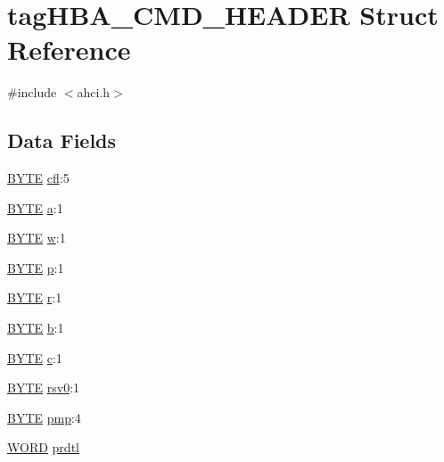 \hypertarget{structtagHBA__CMD__HEADER}{}\section{tag\+H\+B\+A\+\_\+\+C\+M\+D\+\_\+\+H\+E\+A\+D\+ER Struct Reference}
\label{structtagHBA__CMD__HEADER}


{\ttfamily \#include $<$ahci.\+h$>$}

\subsection*{Data Fields}
\begin{DoxyCompactItemize}
\item 
\hyperlink{ahci_8h_aae9749d96e15ccb4f482dd5f55d98f9b}{B\+Y\+TE} \hyperlink{structtagHBA__CMD__HEADER_a9b96c30cf860921253cd6cbac596307c}{cfl}\+:5
\item 
\hyperlink{ahci_8h_aae9749d96e15ccb4f482dd5f55d98f9b}{B\+Y\+TE} \hyperlink{structtagHBA__CMD__HEADER_ac07bb464769560ba80f2fdf92917a3a5}{a}\+:1
\item 
\hyperlink{ahci_8h_aae9749d96e15ccb4f482dd5f55d98f9b}{B\+Y\+TE} \hyperlink{structtagHBA__CMD__HEADER_a1e268f69308d471e20b13dbfadc2b4ac}{w}\+:1
\item 
\hyperlink{ahci_8h_aae9749d96e15ccb4f482dd5f55d98f9b}{B\+Y\+TE} \hyperlink{structtagHBA__CMD__HEADER_a907bfe5e928116c55338fd104557af8b}{p}\+:1
\item 
\hyperlink{ahci_8h_aae9749d96e15ccb4f482dd5f55d98f9b}{B\+Y\+TE} \hyperlink{structtagHBA__CMD__HEADER_ac78c4a22ee2ff09061a213403da50660}{r}\+:1
\item 
\hyperlink{ahci_8h_aae9749d96e15ccb4f482dd5f55d98f9b}{B\+Y\+TE} \hyperlink{structtagHBA__CMD__HEADER_a457f51749a36f13b1670185f113f55f9}{b}\+:1
\item 
\hyperlink{ahci_8h_aae9749d96e15ccb4f482dd5f55d98f9b}{B\+Y\+TE} \hyperlink{structtagHBA__CMD__HEADER_ac17a38c08ae3194b80e2a95180c409b5}{c}\+:1
\item 
\hyperlink{ahci_8h_aae9749d96e15ccb4f482dd5f55d98f9b}{B\+Y\+TE} \hyperlink{structtagHBA__CMD__HEADER_a4c8e9a5b66acfabb4457bc4d28deaaa4}{rsv0}\+:1
\item 
\hyperlink{ahci_8h_aae9749d96e15ccb4f482dd5f55d98f9b}{B\+Y\+TE} \hyperlink{structtagHBA__CMD__HEADER_a7d81a1f20de80f4205d635e6975c4057}{pmp}\+:4
\item 
\hyperlink{ahci_8h_ab24077addd3b7b13e086987ff296552c}{W\+O\+RD} \hyperlink{structtagHBA__CMD__HEADER_a6be02a265a235d2fae8eb7d489d2781b}{prdtl}

\end{DoxyCompactItemize}
